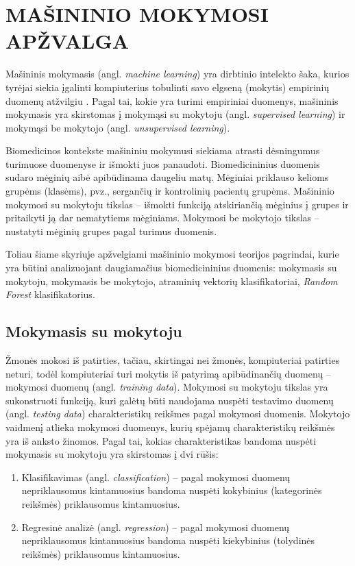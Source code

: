 \section{MAŠININIO MOKYMOSI APŽVALGA}
\label{darbu_apzvalga}

Mašininis mokymasis (angl. \textit{machine learning}) yra dirbtinio intelekto šaka, kurios tyrėjai siekia įgalinti kompiuterius tobulinti savo elgseną (mokytis) empirinių duomenų atžvilgiu \cite{duda2001pattern}. Pagal tai, kokie yra turimi empiriniai duomenys, mašininis mokymasis yra skirstomas į mokymąsi su mokytoju (angl. \textit{supervised learning}) ir mokymąsi be mokytojo (angl. \textit{unsupervised learning}).

Biomedicinos kontekste mašininiu mokymusi siekiama atrasti dėsningumus turimuose duomenyse ir išmokti juos panaudoti. Biomedicininius duomenis sudaro mėginių aibė apibūdinama daugeliu matų. Mėginiai priklauso kelioms grupėms (klasėms), pvz., sergančių ir kontrolinių pacientų grupėms. Mašininio mokymosi su mokytoju tikslas -- išmokti funkciją atskiriančią mėginius į grupes ir pritaikyti ją dar nematytiems mėginiams. Mokymosi be mokytojo tikslas -- nustatyti mėginių grupes pagal turimus duomenis.

Toliau šiame skyriuje apžvelgiami mašininio mokymosi teorijos pagrindai, kurie yra būtini analizuojant daugiamačius biomedicininius duomenis: mokymasis su mokytoju, mokymasis be mokytojo, atraminių vektorių klasifikatoriai, \textit{Random Forest} klasifikatorius.

\subsection{Mokymasis su mokytoju}

Žmonės mokosi iš patirties, tačiau, skirtingai nei žmonės, kompiuteriai patirties neturi, todėl kompiuteriai turi mokytis iš patyrimą apibūdinančių duomenų -- mokymosi duomenų (angl. \textit{training data}). Mokymosi su mokytoju tikslas yra sukonstruoti funkciją, kuri galėtų būti naudojama nuspėti testavimo duomenų (angl. \textit{testing data}) charakteristikų reikšmes pagal mokymosi duomenis. Mokytojo vaidmenį atlieka mokymosi duomenys, kurių spėjamų charakteristikų reikšmės yra iš anksto žinomos. Pagal tai, kokias charakteristikas bandoma nuspėti mokymasis su mokytoju yra skirstomas į dvi rūšis:
\begin{enumerate}
  \item Klasifikavimas (angl. \textit{classification}) -- pagal mokymosi duomenų nepriklausomus kintamuosius bandoma nuspėti kokybinius (kategorinės reikšmės) priklausomus kintamuosius.
  \item Regresinė analizė (angl. \textit{regression}) -- pagal mokymosi duomenų nepriklausomus kintamuosius bandoma nuspėti kiekybinius (tolydinės reikšmės) priklausomus kintamuosius.
\end{enumerate} 

